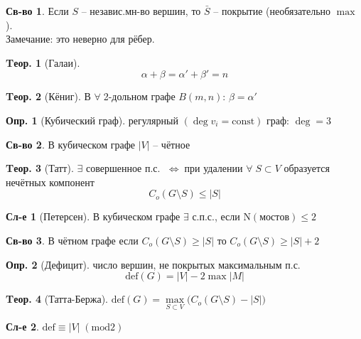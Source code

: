 \documentclass[a4paper,12pt]{article}
\theoremstyle{definition}
\newtheorem{definition}{Опр.}[section]
\newtheorem*{property}{Св-во}  %
\theoremstyle{definition}
\newtheorem{theorem}{Tеор.}[section]
\newtheorem*{corollary}{Сл-е} %
\def\iiff{$\;\Longleftrightarrow\;$}
\def\iiany{$\forall\;$}
\begin{document}
\begin{property}
	Если $S$ -- независ.мн-во вершин, то $\bar{S}$ -- покрытие (необязательно $\max$).\\
	Замечание: это неверно для рёбер.
\end{property}

\begin{theorem}[Галаи]
	\[ \alpha + \beta = \alpha' + \beta' = n \]
\end{theorem}

\begin{theorem}[Кёниг]
	В \iiany 2-дольном графе $B(m,n)$: $\beta = \alpha'$
\end{theorem}

\begin{definition}[Кубический граф]
	регулярный $(\deg v_i = \mathrm{const})$ граф: $\deg = 3$
\end{definition}

\begin{property}
	В кубическом графе $|V|$ -- чётное
\end{property}

\begin{theorem}[Татт]
	$\exists$ совершенное п.с. \iiff при удалении \iiany $S \subset V$ образуется нечётных компонент
	\[ C_{o}(G \setminus S) \leqslant |S| \]
\end{theorem}

\begin{corollary}[Петерсен]
	В кубическом графе $\exists$ с.п.с., если $\mathrm{N}(мостов) \leqslant 2$
\end{corollary}

\begin{property}
В чётном графе если $C_{o}(G \setminus S) \ge |S|$ то $C_{o}(G \setminus S) \geqslant |S|+2$
\end{property}

\begin{definition}[Дефицит]
	число вершин, не покрытых максимальным п.с.
	\[ \mathrm{def}(G)=|V|-2\max|M| \]
\end{definition}

\begin{theorem}[Татта-Бержа]
	$ \mathrm{def}(G) = \max\limits_{S \subset V} \big( C_{o}(G \setminus S) - \left|S\right| \big) $
\end{theorem}

\begin{corollary}
	$ \mathrm{def} \equiv |V| \; (\mathrm{mod} 2) $
\end{corollary}
\end{document}
